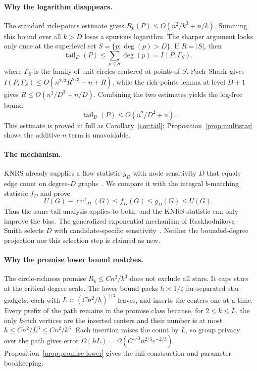 \documentclass[11pt]{article}
\newcommand{\eps}{\varepsilon}
\newcommand{\tail}{\operatorname{tail}}
\begin{document}
\paragraph{Why the logarithm disappears.}
The standard rich-points estimate gives \(R_k(P)\le O(n^2/k^3+n/k)\). Summing this bound over all \(k>D\) loses a spurious logarithm. The sharper argument looks only once at the superlevel set \(S=\{p:\deg(p)>D\}\). If \(R=|S|\), then
\[
\tail_D(P)\le\sum_{p\in S}\deg(p)=I(P,\Gamma_S),
\]
where \(\Gamma_S\) is the family of unit circles centered at points of \(S\). Pach--Sharir gives \(I(P,\Gamma_S)\le O(n^{2/3}R^{2/3}+n+R)\), while the rich-points lemma at level \(D+1\) gives \(R\le O(n^2/D^3+n/D)\). Combining the two estimates yields the log-free bound
\[
\tail_D(P)\le O(n^2/D^2+n).
\]
This estimate is proved in full as Corollary~\ref{cor:tail}; Proposition~\ref{prop:multistar} shows the additive \(n\) term is unavoidable.

\paragraph{The mechanism.}
KNRS already supplies a flow statistic \(g_D\) with node sensitivity \(D\) that equals edge count on degree-\(D\) graphs~\cite{KNRS13}. We compare it with the integral \(b\)-matching statistic \(f_D\) and prove
\[
U(G)-\tail_D(G)\le f_D(G)\le g_D(G)\le U(G).
\]
Thus the same tail analysis applies to both, and the KNRS statistic can only improve the bias. The generalized exponential mechanism of Raskhodnikova--Smith selects \(D\) with candidate-specific sensitivity~\cite{RS16}. Neither the bounded-degree projection nor this selection step is claimed as new.

\paragraph{Why the promise lower bound matches.}
The circle-richness promise \(R_k\le Cn^2/k^3\) does not exclude all stars. It caps stars at the critical degree scale. The lower bound packs \(h\asymp1/\eps\) far-separated star gadgets, each with \(L\asymp(Cn^2/h)^{1/3}\) leaves, and inserts the centers one at a time. Every prefix of the path remains in the promise class because, for \(2\le k\le L\), the only \(k\)-rich vertices are the inserted centers and their number is at most \(h\le Cn^2/L^3\le Cn^2/k^3\). Each insertion raises the count by \(L\), so group privacy over the path gives error \(\Omega(hL)=\Omega(C^{1/3}n^{2/3}\eps^{-2/3})\). Proposition~\ref{prop:promise-lower} gives the full construction and parameter bookkeeping.
\end{document}
